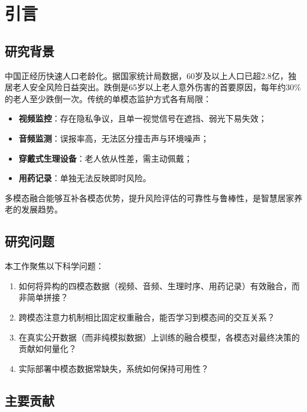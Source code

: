 \chapter{引言}
\label{chap:intro}

\section{研究背景}

中国正经历快速人口老龄化。据国家统计局数据，60岁及以上人口已超2.8亿，独居老人安全风险日益突出。跌倒是65岁以上老人意外伤害的首要原因，每年约30\%的老人至少跌倒一次\cite{rachakonda2020cstick}。传统的单模态监护方式各有局限：

\begin{itemize}
    \item \textbf{视频监控}：存在隐私争议，且单一视觉信号在遮挡、弱光下易失效；
    \item \textbf{音频监测}：误报率高，无法区分撞击声与环境噪声\cite{popescu2009acoustic}；
    \item \textbf{穿戴式生理设备}：老人依从性差，需主动佩戴；
    \item \textbf{用药记录}：单独无法反映即时风险。
\end{itemize}

多模态融合能够互补各模态优势，提升风险评估的可靠性与鲁棒性，是智慧居家养老的发展趋势\cite{baltrusaitis2019multimodal}。

\section{研究问题}

本工作聚焦以下科学问题：

\begin{enumerate}
    \item 如何将异构的四模态数据（视频、音频、生理时序、用药记录）有效融合，而非简单拼接？
    \item 跨模态注意力机制相比固定权重融合，能否学习到模态间的交互关系？
    \item 在真实公开数据（而非纯模拟数据）上训练的融合模型，各模态对最终决策的贡献如何量化？
    \item 实际部署中模态数据常缺失，系统如何保持可用性？
\end{enumerate}

\section{主要贡献}

